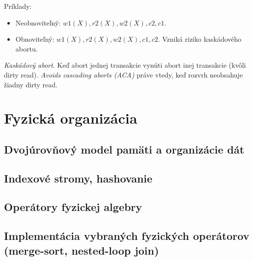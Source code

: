 \documentclass[10pt,a4paper]{article}
\begin{document}
Príklady: 
\begin{itemize}
\item Neobnoviteľný: $w1(X), r2(X), w2(X), c2, c1$.  
\item Obnoviteľný: $w1(X), r2(X), w2(X), c1, c2$. Vzniká riziko kaskádového abortu. 
\end{itemize}

\emph{Kaskádový abort}. Keď abort jednej transakcie vynúti abort inej transakcie (kvôli dirty read).
\emph{Avoids cascading aborts (ACA)} práve vtedy, keď rozvrh neobsahuje žiadny dirty read. 
    

\section{Fyzická organizácia} 
\label{fyzicka_organizacia}

\subsection{Dvojúrovňový model pamäti a organizácie dát}
\subsection{Indexové stromy, hashovanie}
\subsection{Operátory fyzickej algebry}
\subsection{Implementácia vybraných fyzických operátorov (merge-sort, nested-loop join)}


\clearpage
\end{document}
